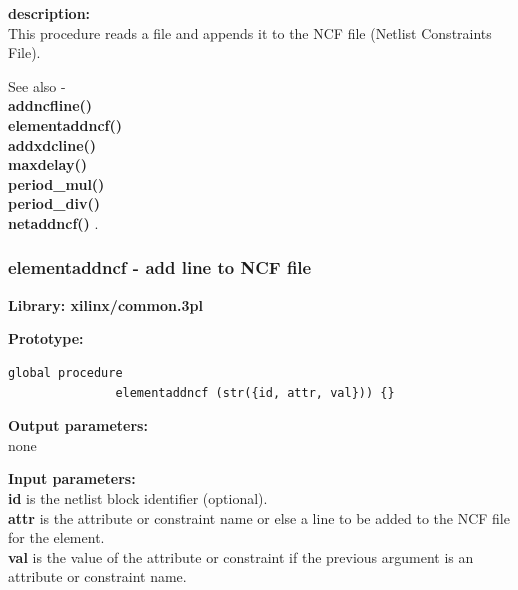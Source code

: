             {\bf description:} \\
            This procedure reads a file and appends it to the NCF file
            (Netlist Constraints File).

            See also - \\   
            {\bf addncfline()} \\
            {\bf elementaddncf()} \\
            {\bf addxdcline()} \\
            {\bf maxdelay()} \\
            {\bf period\_mul()} \\
            {\bf period\_div()} \\
            {\bf netaddncf()} .






    


        \subsubsection{elementaddncf - add line to NCF file}\label{sec:lpelementaddncf}
            
            {\bf Library: xilinx/common.3pl}

            {\bf Prototype:} \\
            \vsp
            \begin{lstlisting}[gobble=12, language=threepl]
               global procedure
               elementaddncf (str({id, attr, val})) {}
            \end{lstlisting}

            {\bf Output parameters:} \\
            none

            {\bf Input parameters:} \\
            {\bf id} is the netlist block identifier (optional). \\
            {\bf attr} is the attribute or constraint name or else a line to be added to the NCF file for the element. \\
            {\bf val} is the value of the attribute or constraint if the previous argument
            is an attribute or constraint name. \\
        
